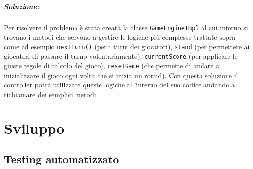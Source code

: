 \documentclass[a4paper,12pt]{report}
\begin{document}
\paragraph*{Soluzione:} Per risolvere il problema è stata creata la classe \texttt{GameEngineImpl} al cui interno si trovano i metodi che servono a gestire le logiche più complesse trattate sopra come ad esempio \texttt{nextTurn()} (per i turni dei giocatori), \texttt{stand} (per permettere ai giocatori di passare il turno volontariamente), \texttt{currentScore} (per applicare le giuste regole di calcolo del gioco), \texttt{resetGame} (che permette di andare a inizializzare il gioco ogni volta che si inizia un round).
Con questa soluzione il controller potrà utilizzare queste logiche all'interno del suo codice andando a richiamare dei semplici metodi.


\chapter{Sviluppo}
\section{Testing automatizzato}
\end{document}
